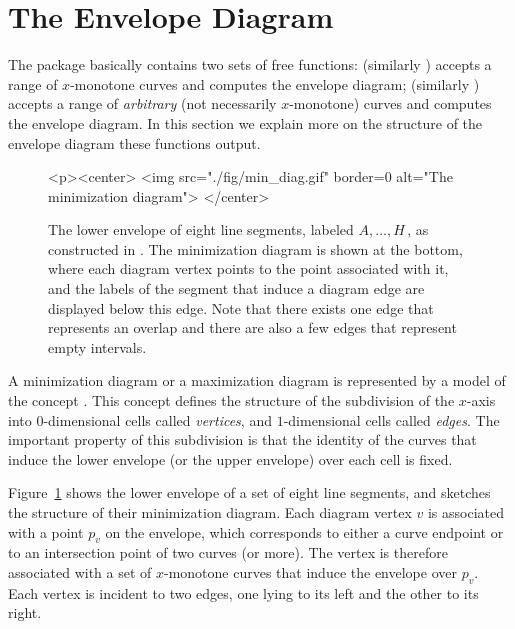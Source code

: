 \section{The Envelope Diagram}
\label{env2_sec:env_diag}

The package basically contains two sets of free functions:
 (similarly
 ) accepts a range of $x$-monotone
curves and computes the envelope diagram; 
 (similarly
) accepts a range of {\em arbitrary} (not
necessarily $x$-monotone) curves and computes the envelope diagram.
In this section we explain more on the structure of the envelope
diagram these functions output.

\begin{figure}[t]
\begin{ccTexOnly}
  \begin{center}
  \end{center}
\end{ccTexOnly}
\begin{ccHtmlOnly}
  <p><center>
  <img src="./fig/min_diag.gif" border=0 alt="The minimization diagram">
  </center>
\end{ccHtmlOnly}
\caption{The lower envelope of eight line segments, labeled
$A, \ldots, H$\,, as constructed in .
The minimization diagram is shown at the bottom, where
each diagram vertex points to the point associated with it, and the
labels of the segment that induce a diagram edge are displayed below
this edge. Note that there exists one edge that represents an overlap
and there are also a few edges that represent empty
intervals.\label{env2_fig:min_diag}}
\end{figure}

A minimization diagram or a maximization diagram is represented by
a model of the concept . This concept defines
the structure of the subdivision of the $x$-axis into $0$-dimensional
cells called {\em vertices}, and $1$-dimensional cells called {\em edges}.
The important property of this subdivision is that the identity of
the curves that induce the lower envelope (or the upper envelope)
over each cell is fixed.

Figure~\ref{env2_fig:min_diag} shows the lower envelope of a set of
eight line segments, and sketches the structure of their minimization
diagram. Each diagram vertex $v$ is associated with a point $p_v$ on
the envelope, which corresponds to either a curve endpoint
or to an intersection point of two curves (or more). The vertex is
therefore associated with a set of $x$-monotone curves that induce the
envelope over $p_v$. Each vertex is incident to two edges, one lying
to its left and the other to its right.

